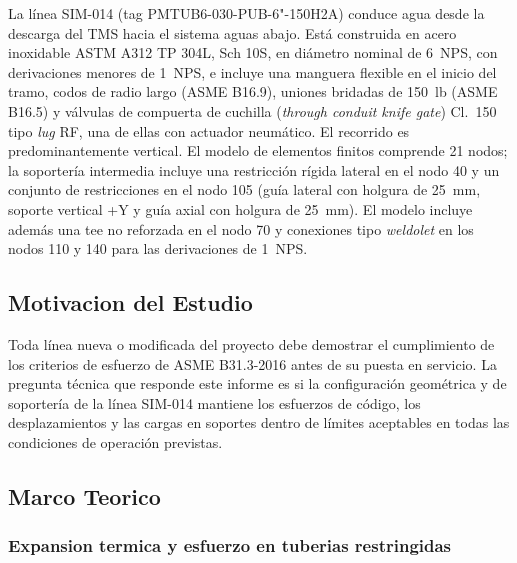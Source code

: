 La l\'{i}nea SIM-014 (tag PMTUB6-030-PUB-6"-150H2A) conduce agua desde la
descarga del TMS hacia el sistema aguas abajo. Est\'{a} construida en acero
inoxidable ASTM A312 TP 304L, Sch 10S, en di\'{a}metro nominal de 6~NPS, con
derivaciones menores de 1~NPS, e incluye una manguera flexible en el inicio del
tramo, codos de radio largo (ASME B16.9), uniones bridadas de 150~lb
(ASME B16.5) y v\'{a}lvulas de compuerta de cuchilla (\textit{through conduit
knife gate}) Cl.~150 tipo \textit{lug} RF, una de ellas con actuador
neum\'{a}tico. El recorrido es predominantemente vertical. El modelo de
elementos finitos comprende 21 nodos; la soporter\'{i}a intermedia incluye una
restricci\'{o}n r\'{i}gida lateral en el nodo 40 y un conjunto de restricciones
en el nodo 105 (gu\'{i}a lateral con holgura de 25~\si{mm}, soporte vertical +Y
y gu\'{i}a axial con holgura de 25~\si{mm}). El modelo incluye adem\'{a}s una
tee no reforzada en el nodo 70 y conexiones tipo \textit{weldolet} en los
nodos 110 y 140 para las derivaciones de 1~NPS.

\subsection{Motivacion del Estudio}

Toda l\'{i}nea nueva o modificada del proyecto debe demostrar el cumplimiento de
los criterios de esfuerzo de ASME B31.3-2016 antes de su puesta en servicio.
La pregunta t\'{e}cnica que responde este informe es si la configuraci\'{o}n
geom\'{e}trica y de soporter\'{i}a de la l\'{i}nea SIM-014 mantiene los esfuerzos
de c\'{o}digo, los desplazamientos y las cargas en soportes dentro de l\'{i}mites
aceptables en todas las condiciones de operaci\'{o}n previstas.

\subsection{Marco Teorico}
\label{ssec:marco}

\subsubsection{Expansion termica y esfuerzo en tuberias restringidas}


